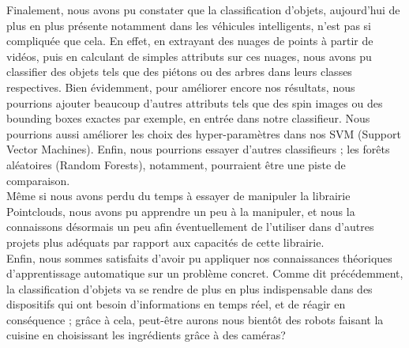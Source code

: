 Finalement, nous avons pu constater que la classification d'objets, aujourd'hui de plus en plus présente notamment dans les véhicules intelligents, n'est pas si compliquée que cela. En effet, en extrayant des nuages de points à partir de vidéos, puis en calculant de simples attributs sur ces nuages, nous avons pu classifier des objets tels que des piétons ou des arbres dans leurs classes respectives. Bien évidemment, pour améliorer encore nos résultats, nous pourrions ajouter beaucoup d'autres attributs tels que des spin images ou des bounding boxes exactes par exemple, en entrée dans notre classifieur. Nous pourrions aussi améliorer les choix des hyper-paramètres dans nos SVM (Support Vector Machines). Enfin, nous pourrions essayer d'autres classifieurs ; les forêts aléatoires (Random Forests), notamment, pourraient être une piste de comparaison.\\

Même si nous avons perdu du temps à essayer de manipuler la librairie Pointclouds, nous avons pu apprendre un peu à la manipuler, et nous la connaissons désormais un peu afin éventuellement de l'utiliser dans d'autres projets plus adéquats par rapport aux capacités de cette librairie.\\

Enfin, nous sommes satisfaits d'avoir pu appliquer nos connaissances théoriques d'apprentissage automatique sur un problème concret. Comme dit précédemment, la classification d'objets va se rendre de plus en plus indispensable dans des dispositifs qui ont besoin d'informations en temps réel, et de réagir en conséquence ; grâce à cela, peut-être aurons nous bientôt des robots faisant la cuisine en choisissant les ingrédients grâce à des caméras?\\